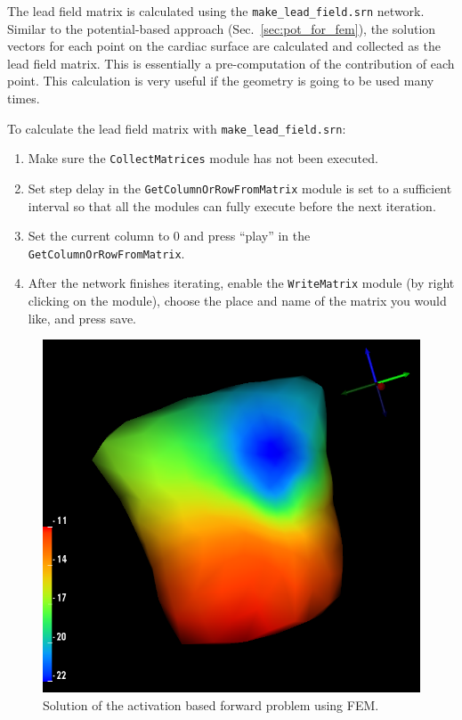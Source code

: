 \documentclass[fleqn,11pt,openany]{book}
\begin{document}
The lead field matrix is calculated using the {\tt make\_lead\_field.srn} network.
Similar to the potential-based approach (Sec.~\ref{sec:pot_for_fem}), the solution
vectors for each point on the cardiac surface are calculated and collected as the
lead field matrix. This is essentially a pre-computation of the contribution of each
point. This calculation is very useful if the geometry is going to be used many times.


To calculate the lead field matrix with {\tt make\_lead\_field.srn}:
\begin{enumerate}
\item{Make sure the {\tt CollectMatrices} module has not been executed.}
\item{Set step delay in the {\tt GetColumnOrRowFromMatrix} module is set to a sufficient interval so that all the modules can fully execute before the next iteration.}
\item{Set the current column to 0 and press ``play'' in the {\tt GetColumnOrRowFromMatrix}.}
\item{After the network finishes iterating, enable the {\tt WriteMatrix} module (by right clicking on the module), choose the place and name of the matrix you would like, and press save.  }
\end{enumerate}

\begin{figure}[H]
\begin{center}
\includegraphics[width=\textwidth]{ECGToolkitGuide_figures/act_for_fem_results.png}
\caption{Solution of the activation based forward problem using FEM.}
\label{fig:act_fem_for_sol}
\end{center}
\end{figure}
\end{document}
